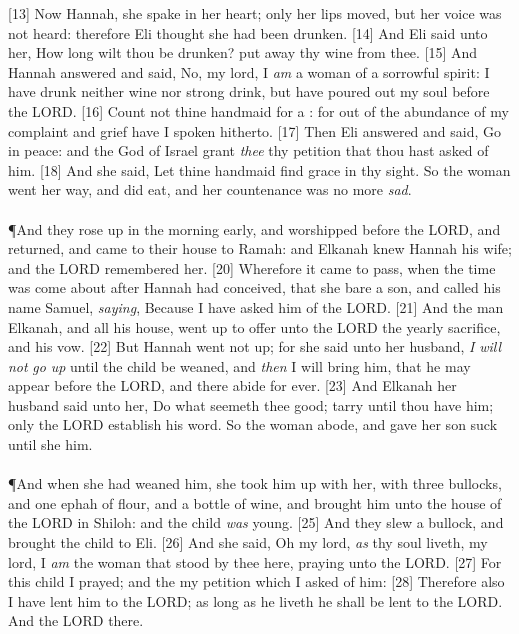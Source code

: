 [13] \textcolor[cmyk]{0.99998,1,0,0}{Now Hannah, she spake in her heart; only her lips moved, but her voice was not heard: therefore Eli thought she had been drunken.}
[14] \textcolor[cmyk]{0.99998,1,0,0}{And Eli said unto her, How long wilt thou be drunken? put away thy wine from thee.}
[15] \textcolor[cmyk]{0.99998,1,0,0}{And Hannah answered and said, No, my lord, I \emph{am} a woman of a sorrowful spirit: I have drunk neither wine nor strong drink, but have poured out my soul before the LORD.}
[16] \textcolor[cmyk]{0.99998,1,0,0}{Count not thine handmaid for a : for out of the abundance of my complaint and grief have I spoken hitherto.}
[17] \textcolor[cmyk]{0.99998,1,0,0}{Then Eli answered and said, Go in peace: and the God of Israel grant \emph{thee} thy petition that thou hast asked of him.}
[18] \textcolor[cmyk]{0.99998,1,0,0}{And she said, Let thine handmaid find grace in thy sight. So the woman went her way, and did eat, and her countenance was no more \emph{sad}.}\\
\\
\P \textcolor[cmyk]{0.99998,1,0,0}{And they rose up in the morning early, and worshipped before the LORD, and returned, and came to their house to Ramah: and Elkanah knew Hannah his wife; and the LORD remembered her.}
[20] \textcolor[cmyk]{0.99998,1,0,0}{Wherefore it came to pass, when the time was come about after Hannah had conceived, that she bare a son, and called his name Samuel, \emph{saying}, Because I have asked him of the LORD.}
[21] \textcolor[cmyk]{0.99998,1,0,0}{And the man Elkanah, and all his house, went up to offer unto the LORD the yearly sacrifice, and his vow.}
[22] \textcolor[cmyk]{0.99998,1,0,0}{But Hannah went not up; for she said unto her husband, \emph{I} \emph{will} \emph{not} \emph{go} \emph{up} until the child be weaned, and \emph{then} I will bring him, that he may appear before the LORD, and there abide for ever.}
[23] \textcolor[cmyk]{0.99998,1,0,0}{And Elkanah her husband said unto her, Do what seemeth thee good; tarry until thou have  him; only the LORD establish his word. So the woman abode, and gave her son suck until she  him.}\\
\\
\P \textcolor[cmyk]{0.99998,1,0,0}{And when she had weaned him, she took him up with her, with three bullocks, and one ephah of flour, and a bottle of wine, and brought him unto the house of the LORD in Shiloh: and the child \emph{was} young.}
[25] \textcolor[cmyk]{0.99998,1,0,0}{And they slew a bullock, and brought the child to Eli.}
[26] \textcolor[cmyk]{0.99998,1,0,0}{And she said, Oh my lord, \emph{as} thy soul liveth, my lord, I \emph{am} the woman that stood by thee here, praying unto the LORD.}
[27] \textcolor[cmyk]{0.99998,1,0,0}{For this child I prayed; and the  my petition which I asked of him:}
[28] \textcolor[cmyk]{0.99998,1,0,0}{Therefore also I have lent him to the LORD; as long as he liveth he shall be lent to the LORD. And  the LORD there.}